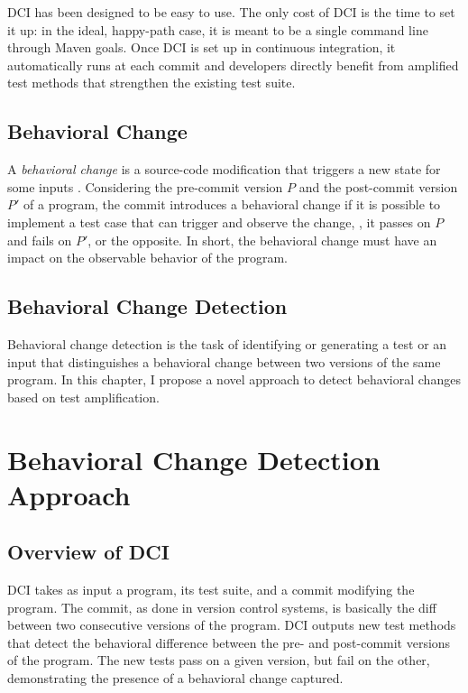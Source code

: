 DCI has been designed to be easy to use.
The only cost of DCI is the time to set it up: in the ideal, happy-path case, it is meant to be a single command line through Maven goals.
Once DCI is set up in continuous integration, it automatically runs at each commit and developers directly benefit from amplified test methods that strengthen the existing test suite.

%
%
\subsection{Behavioral Change}
\label{subsec:dci:background:behavioral-change}

A \emph{behavioral change} is a source-code modification that triggers a new state for some inputs \cite{saff2004experimental}.
Considering the pre-commit version $P$ and the post-commit version $P'$ of a program, the commit introduces a behavioral change if it is possible to implement a test case that can trigger and observe the change, \ie, it passes on $P$ and fails on $P'$, or the opposite.
In short, the behavioral change must have an impact on the observable behavior of the program.

%
%
\subsection{Behavioral Change Detection}
\label{subsec:dci:background:behavioral-change-detection}

Behavioral change detection is the task of identifying or generating a test or an input that distinguishes a behavioral change between two versions of the same program.
In this chapter, I propose a novel approach to detect behavioral changes based on test amplification.


\section{Behavioral Change Detection Approach}
\label{sec:dci:techniques}

\subsection{Overview of DCI}
\label{subsec:global_overview}

DCI takes as input a program, its test suite, and a commit modifying the program.
The commit, as done in version control systems, is basically the diff between two consecutive versions of the program.
%
DCI outputs new test methods that detect the behavioral difference between the pre- and post-commit versions of the program.
The new tests pass on a given version, but fail on the other, demonstrating the presence of a behavioral change captured.%

